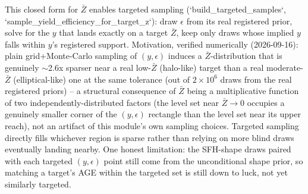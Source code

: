 \documentclass{aastex7}
\begin{document}
This closed form for $\bar{Z}$ enables targeted sampling
(`build\_targeted\_samples`, `sample\_yield\_efficiency\_for\_target\_z`):
draw $\epsilon$ from its real registered prior, solve for the $y$ that
lands exactly on a target $\bar{Z}$, keep only draws whose implied $y$
falls within $y$'s registered support. Motivation, verified numerically
(2026-09-16): plain grid+Monte-Carlo sampling of $(y, \epsilon)$ induces a
$\bar{Z}$-distribution that is genuinely $\sim$2.6x sparser near a real
low-$\bar{Z}$ (halo-like) target than a real moderate-$\bar{Z}$
(elliptical-like) one at the same tolerance (out of $2\times10^6$ draws
from the real registered priors) -- a structural consequence of $\bar{Z}$
being a multiplicative function of two independently-distributed factors
(the level set near $\bar{Z}\to0$ occupies a genuinely smaller corner of
the $(y,\epsilon)$ rectangle than the level set near its upper reach), not
an artifact of this module's own sampling choices. Targeted sampling
directly fills whichever region is sparse rather than relying on more
blind draws eventually landing nearby. One honest limitation: the SFH-shape
draws paired with each targeted $(y,\epsilon)$ point still come from the
unconditional shape prior, so matching a target's AGE within the targeted
set is still down to luck, not yet similarly targeted.
\end{document}
